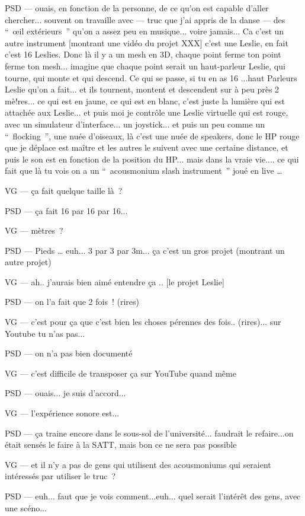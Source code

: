 PSD — ouais, en fonction de la personne, de ce qu'on est capable d'aller chercher... souvent on travaille avec — truc que j'ai appris de la danse — des “ œil extérieurs ” qu'on a assez peu en musique... voire jamais... Ca c'est un autre instrument [montrant une vidéo du projet XXX] c'est une Leslie, en fait c'est 16 Leslies. Donc là il y a un mesh en 3D, chaque point ferme ton point ferme ton mesh... imagine que chaque point serait un haut-parleur Leslie, qui tourne, qui monte et qui descend. Ce qui se passe, si tu en as 16 ...haut Parleurs Leslie qu'on a fait... et ils tournent, montent et descendent sur à peu près 2 mè!res... ce qui est en jaune, ce qui est en blanc, c'est juste la lumière qui est attachée aux Leslie... et puis moi je contrôle une Leslie virtuelle qui est rouge, avec un simulateur d'interface... un joystick... et puis un peu comme un “ flocking ”, une nuée d'oiseaux, là c'est une nuée de speakers, donc le HP rouge que je déplace est maître et les autres le suivent avec une certaine distance, et puis le son est en fonction de la position du HP... mais dans la vraie vie.... ce qui fait que là tu vois on a un “ acousmonium slash instrument ” joué en live …  

VG — ça fait quelque taille là ? 

PSD — ça fait 16 par 16 par 16...  

VG — mètres ? 

PSD — Pieds … euh... 3 par 3 par 3m... ça c'est un gros projet (montrant un autre projet) 

VG — ah.. j'aurais bien aimé entendre ça .. [le projet Leslie] 

PSD — on l'a fait que 2 fois ! (rires) 

VG — c'est pour ça que c'est bien les choses pérennes des fois.. (rires)... sur Youtube tu n'as pas... 

PSD — on n'a pas bien documenté 

VG — c'est difficile de transposer ça sur YouTube quand même 

PSD — ouais... je suis d'accord... 

VG — l'expérience sonore est... 

PSD — ça traine encore dans le sous-sol de l'université... faudrait le refaire...on était sensés le faire à la SATT, mais bon ce ne sera pas possible 

VG — et il n'y a pas de gens qui utilisent des acousmoniums qui seraient intéressés par utiliser le truc ? 

PSD — euh... faut que je vois comment...euh... quel serait l'intérêt des gens, avec une scéno... 


